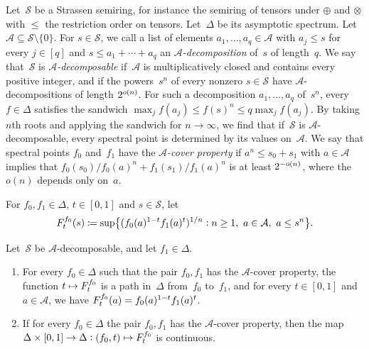 \documentclass[11pt,letterpaper]{article}
\begin{document}
Let~\(\mathcal{S}\) be a Strassen semiring, for instance the semiring of tensors under $\oplus$ and $\otimes$ with $\leq$ the restriction order on tensors. Let~\(\Delta\) be its asymptotic spectrum. Let \(\mathcal{A}\subseteq\mathcal{S}\setminus\{0\}\). For \(s\in\mathcal{S}\), we call a list of elements \(a_1,\ldots,a_q\in\mathcal{A}\) with \(a_j\leq s\) for every \(j\in[q]\) and \(s\leq a_1+\cdots+a_q\) an \emph{\(\mathcal{A}\)-decomposition} of~\(s\) of length~\(q\). We say that~\(\mathcal{S}\) is \emph{\(\mathcal{A}\)-decomposable} if~\(\mathcal{A}\) is multiplicatively closed and contains every positive integer, and if the powers~\(s^n\) of every nonzero \(s\in\mathcal{S}\) have \(\mathcal{A}\)-decompositions of length \(2^{\smash{o(n)}}\). For such a decomposition \(a_1,\ldots,a_q\) of~\(s^n\), every \(f\in\Delta\) satisfies the sandwich \(\max_jf(a_j)\leq f(s)^n\leq q\max_jf(a_j)\). By taking $n$th roots and applying the sandwich for $n\to\infty$, we find that if~\(\mathcal{S}\) is \(\mathcal{A}\)-decomposable, every spectral point is determined by its values on~\(\mathcal{A}\).
We say that spectral points \(f_0\) and~\(f_1\) have the \emph{\(\mathcal{A}\)-cover property} if \(a^n\leq s_0+s_1\) with \(a\in\mathcal{A}\) implies that \(f_0(s_0)/f_0(a)^n+f_1(s_1)/f_1(a)^n\) is at least \(2^{\smash{-o(n)}}\), where the \(o(n)\) depends only on~\(a\).

For \(f_0,f_1\in\Delta\), \(t\in[0,1]\) and \(s\in\mathcal{S}\), let
\[
F^{\smash[t]{f_0}}_t(s)\coloneqq\sup\bigl\{(f_0(a)^{1-t}f_1(a)^t)^{1/n}:n\geq1,\ a\in\mathcal{A},\ a\leq s^n\bigr\}.
\]

\begin{theorem}\label{th:intro-interpolation}
Let~\(\mathcal{S}\) be \(\mathcal{A}\)-decomposable, and let \(f_1\in\Delta\).
\begin{enumerate}[\upshape(i)]
\item\label{it:intro-interp-path} For every \(f_0\in\Delta\) such that the pair \(f_0,f_1\) has the \(\mathcal{A}\)-cover property, the function \(t\mapsto F^{\smash[t]{f_0}}_t\) is a path in~\(\Delta\) from~\(f_0\) to~\(f_1\), and for every \(t\in[0,1]\) and \(a\in\mathcal{A}\), we have \(F^{\smash[t]{f_0}}_t(a)=f_0(a)^{1-t}f_1(a)^t\).
\item\label{it:intro-interp-cont} If for every \(f_0\in\Delta\) the pair \(f_0,f_1\) has the \(\mathcal{A}\)-cover property, then the map \(\Delta\times[0,1]\to\Delta:(f_0,t)\mapsto F^{\smash[t]{f_0}}_t\) is continuous.
\end{enumerate}
\end{theorem}
\end{document}
